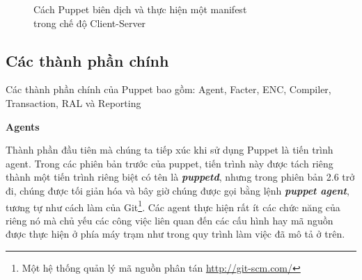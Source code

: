 \begin{figure}[h!]
    \begin{center}
    \end{center}
    \caption{Cách Puppet biên dịch và thực hiện một manifest\\ trong chế độ Client-Server}
    \label{fig:puppet_manifest_to_defined_state_split}
\end{figure}

\clearpage
\subsection{Các thành phần chính}
Các thành phần chính của Puppet bao gồm: Agent, Facter, ENC, Compiler, Transaction, RAL và Reporting


\textbf{\large Agents}


Thành phần đầu tiên mà chúng ta tiếp xúc khi sử dụng Puppet là tiến trình agent. Trong các phiên bản trước của puppet, tiến trình này được tách riêng thành một tiến trình riêng biệt có tên là \textbf{\textit{puppetd}}, nhưng trong phiên bản 2.6 trở đi, chúng được tối giản hóa và bây giờ chúng được gọi bằng lệnh \textbf{\textit{puppet agent}}, tương tự như cách làm của Git\footnote{Một hệ thống quản lý mã nguồn phân tán \url{http://git-scm.com/}}. Các agent thực hiện rất ít các chức năng của riêng nó mà chủ yếu các công việc liên quan đến các cấu hình hay mã nguồn được thực hiện ở phía máy trạm như trong quy trình làm việc đã mô tả ở trên.


